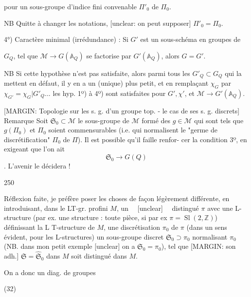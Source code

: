 pour un sous-groupe d'indice fini
convenable $\Pi'_0$ de $\Pi_0$.

NB Quitte à changer les notations, [unclear: on peut supposer] $\Pi'_0 = \Pi_0$.

4°) Caractère minimal (irrédundance) :
Si $G'$ est un sous-schéma en groupes de

\newpage


$G_Q$, tel que $\mathcal{M} \to G(\mathbb{A}_Q)$ se
factorise par $G'(\mathbb{A}_Q)$, alors $G=G'$.

NB Si cette hypothèse n'est pas satisfaite,
alors parmi tous les $G'_Q \subset G_Q$ qui la
mettent en défaut, il y en a un
(unique)
plus petit, et en remplaçant $\chi_G$
par $\chi_{G'} = \chi_G | G'_Q ...$ les hyp.
1º) à 4º) sont satisfaites pour $G', \chi'$,
et $\mathcal{M} \to G'(\mathbb{A}_Q)$.

[MARGIN: Topologie sur les s. g. d'un groupe top. - le cas de ses s. g. discrets]
Remarque Soit $\mathfrak{S}_0 \subset \mathcal{M}$ le
sous-groupe de $\mathcal{M}$ formé des $g \in \mathcal{M}$ qui
sont tels que $g(\Pi_0)$ et $\Pi_0$ soient
commensurables (i.e. qui normalisent
le "germe de discrétification" $\Pi_0$ de $\Pi$).
Il est possible qu'il faille renfor-
cer la condition 3º, en exigeant que
l'on ait
$$\mathfrak{S}_0 \longrightarrow G(Q)$$ .
L'avenir le décidera !

\newpage


250

Réflexion faite, je préfère poser les choses de
façon légèrement différente, en introduisant,
dans le LT-gr. profini $M$, un ~~[unclear]~~
distingué $\pi$ avec une L-structure (par
ex. une structure : toute pièce,
si par ex $\pi = \operatorname{Sl}(2, \mathbb{Z})$) définissant la
L T-structure de $M$, une discrétisation
$\pi_0$ de $\pi$ (dans un sens évident, pour les
L-structures) un sous-groupe discret
$\mathfrak{S}_0 \supset \pi_0$ normalisant $\pi_0$ (NB. dans mon petit
exemple [unclear] on a $\mathfrak{S}_0 = \pi_0$), tel que
[MARGIN: son adh.] $\mathfrak{S} = \widehat{\mathfrak{S}}_0$ dans $M$ soit distingué dans $M$.

On a donc un diag. de groupes

(32)

